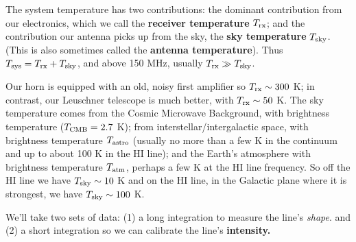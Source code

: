 \documentclass[12pt,preprint]{aastex}
\begin{document}
The system temperature has two contributions: the dominant contribution
  from our electronics, which we call the {\bf receiver temperature} $T_{\rm rx}$;
  and the contribution our antenna picks up from the sky, the {\bf sky temperature}
  $T_{\rm sky}$.  (This is also sometimes called the {\bf antenna temperature}).  
 Thus $T_{\rm sys}= T_{\rm rx} + T_{\rm sky}$, and above 150 MHz, usually $T_{\rm rx} \gg T_{\rm sky}$. 

Our horn is equipped with an old, noisy first amplifier so $T_{\rm rx} \sim
300$ K; in contrast, our Leuschner telescope is much better, with $T_{\rm rx}
\sim 50$ K. The sky temperature comes from the Cosmic Microwave Background,
with brightness temperature ($T_{\rm CMB} = 2.7$ K); from
interstellar/intergalactic space, with brightness temperature
$T_{\rm astro}$ (usually no more than a few K in the continuum and up to
about 100 K in the HI line); and the Earth's atmosphere with brightness
temperature $T_{\rm atm}$, perhaps a few K at the HI line frequency. So
off the HI line we have $T_{\rm sky} \sim 10$ K and on the HI line, in the
Galactic plane where it is strongest, we have $T_{\rm sky} \sim 100$ K.

We'll take two sets of data: (1) a long integration to measure the line's
{\it shape}. and (2) a short integration so we can calibrate the line's
{\bf intensity.}
\end{document}
